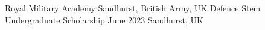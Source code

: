 \begin{cventries}
    \vspace{-4mm}

    \cventry
    {Royal Military Academy Sandhurst, British Army, UK}  %
    {Defence Stem Undergraduate Scholarship} %
    {June 2023}  %
    {Sandhurst, UK}  %
    {
      \vspace{-0.6em}
      \begin{cvexpitems}
      \end{cvexpitems}
    }


\end{cventries}
